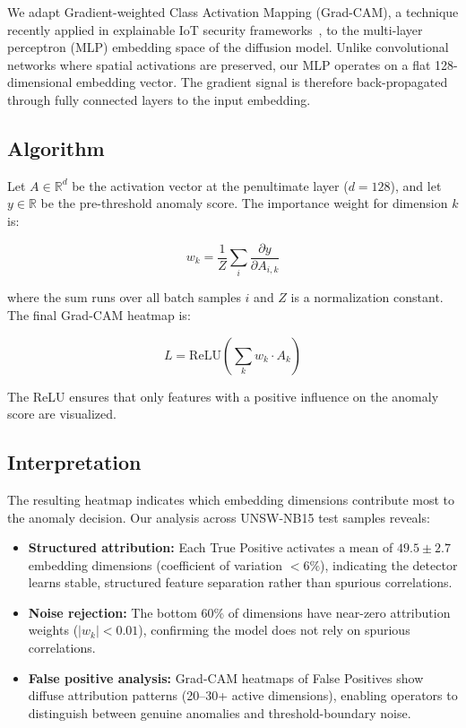 \documentclass[lettersize,journal]{IEEEtran}
\begin{document}
We adapt Gradient-weighted Class Activation Mapping (Grad-CAM), a technique recently applied in explainable IoT security frameworks~\cite{Upender2025_CyberDetect}, to the multi-layer perceptron (MLP) embedding space of the diffusion model. Unlike convolutional networks where spatial activations are preserved, our MLP operates on a flat 128-dimensional embedding vector. The gradient signal is therefore back-propagated through fully connected layers to the input embedding.

\subsection{Algorithm}

Let $A \in \mathbb{R}^{d}$ be the activation vector at the penultimate layer ($d=128$), and let $y \in \mathbb{R}$ be the pre-threshold anomaly score. The importance weight for dimension $k$ is:

\[
w_k = \frac{1}{Z} \sum_{i} \frac{\partial y}{\partial A_{i,k}}
\]

where the sum runs over all batch samples $i$ and $Z$ is a normalization constant. The final Grad-CAM heatmap is:

\[
L = \text{ReLU}\left(\sum_{k} w_k \cdot A_k\right)
\]

The ReLU ensures that only features with a positive influence on the anomaly score are visualized.

\subsection{Interpretation}

The resulting heatmap indicates which embedding dimensions contribute most to the anomaly decision. Our analysis across UNSW-NB15 test samples reveals:

\begin{itemize}
    \item \textbf{Structured attribution:} Each True Positive activates a mean of $49.5 \pm 2.7$ embedding dimensions (coefficient of variation $<6\%$), indicating the detector learns stable, structured feature separation rather than spurious correlations.
    \item \textbf{Noise rejection:} The bottom 60\% of dimensions have near-zero attribution weights ($|w_k| < 0.01$), confirming the model does not rely on spurious correlations.
    \item \textbf{False positive analysis:} Grad-CAM heatmaps of False Positives show diffuse attribution patterns (20--30+ active dimensions), enabling operators to distinguish between genuine anomalies and threshold-boundary noise.
\end{itemize}
\end{document}
